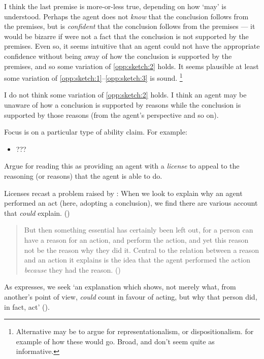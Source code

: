 \documentclass[10pt]{article}
\begin{document}
I think the last premise is more-or-less true, depending on how `may' is understood.
Perhaps the agent does not \emph{know} that the conclusion follows from the premises, but is \emph{confident} that the conclusion follows from the premises --- it would be bizarre if were not a fact that the conclusion is not supported by the premises.
Even so, it seems intuitive that an agent could not have the appropriate confidence without being away of how the conclusion is supported by the premises, and so some variation of \ref{opp:sketch:2} holds.
It seems plausible at least some variation of \ref{opp:sketch:1}--\ref{opp:sketch:3} is sound.\nolinebreak
\footnote{
  Alternative may be to argue for representationalism, or dispositionalism.
  \citeauthor{Neta:2019aa} for example of how these would go.
  Broad, and don't seem quite as informative.
}

I do not think some variation of \ref{opp:sketch:2} holds.
I think an agent may be unaware of how a conclusion is supported by reasons while the conclusion is supported by those reasons (from the agent's perspective and so on).

Focus is on a particular type of ability claim.
For example:
\begin{itemize}
\item ???
\end{itemize}

Argue for reading this as providing an agent with a \emph{license} to appeal to the reasoning (or reasons) that the agent is able to do.

Licenses recast a problem raised by \citeauthor{Davidson:2001aa}:
When we look to explain why an agent performed an act (here, adopting a conclusion), we find there are various account that \emph{could} explain.
(\citeauthor[7--8]{Davidson:2001aa})
\begin{quote}
  But then something essential has certainly been left out, for a person can have a reason for an action, and perform the action, and yet this reason not be the reason why they did it.
  Central to the relation between a reason and an action it explains is the idea that the agent performed the action \emph{because} they had the reason.\nolinebreak
  \mbox{}\hfill\mbox{(\citeyear[9]{Davidson:2001aa})}
\end{quote}
As \citeauthor{Hieronymi:2011aa} expresses, we seek `an explanation which shows, not merely what, from another’s point of view, \emph{could} count in favour of acting, but why that person did, in fact, act' (\citeyear[417]{Hieronymi:2011aa}).
\end{document}
